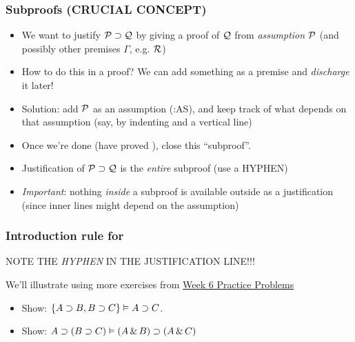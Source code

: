 \begin{frame}
  \frametitle{Subproofs (CRUCIAL CONCEPT)}

  \begin{itemize}[<+->]
    \item We want to justify $\mathcal{P} \supset \mathcal{Q}$ by giving a
    proof of $\mathcal{Q}$ from \textit{assumption} $\mathcal{P}$ (and possibly other premises $\Gamma$, e.g. $\mathcal{R}$)
    \item How to do this in a proof? We can add something as a
    premise and \textit{discharge} it later!
    \item Solution: add $\mathcal{P}$ as an assumption (:AS), and keep track
    of what depends on that assumption (say, by indenting and a vertical
    line)
    \item Once we're done (have proved ), close this ``subproof''.
    \item Justification of $\mathcal{P} \supset \mathcal{Q}$ is the \emph{entire} subproof (use a HYPHEN)
    \item \emph{Important}: nothing \emph{inside} a subproof is available
    outside as a justification (since inner lines might depend on the assumption)
  \end{itemize}
\end{frame}

\begin{frame}
  \frametitle{Introduction rule for \eif}
  \begin{fitchproof}
    \open
     
    \ellipsesline
    \close
     
  \end{fitchproof}

NOTE THE \emph{HYPHEN} IN THE JUSTIFICATION LINE!!!

  We'll illustrate using more exercises from \href{https://tinyurl.com/2p82rpv5}{Week 6 Practice Problems}
  \begin{itemize}
  \item Show: $\{ A \supset B, B \supset C \} \vDash A \supset C$.
  \item Show: $A \supset (B \supset C) \vDash (A \,\&\, B) \supset (A \,\&\, C)$
  \end{itemize}
\end{frame}

\begin{frame}
  \begin{fitchproof}
     \pr{}
     \pr{}
    \open
     
    \close
  \end{fitchproof}
\end{frame}


